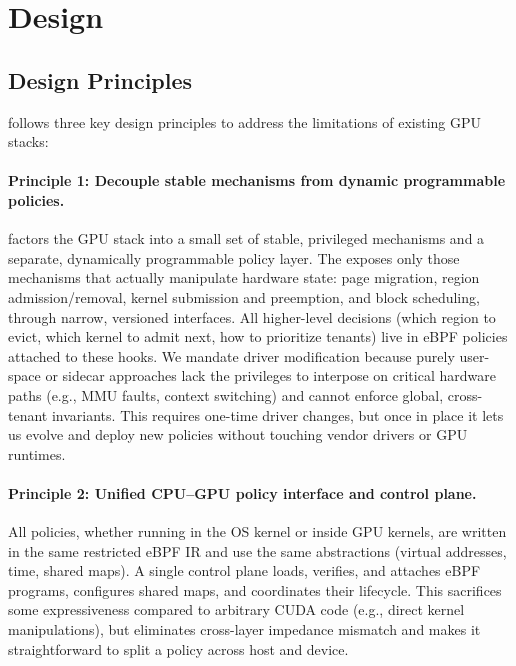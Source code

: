 \section{\sys Design}

\subsection{Design Principles}

\sys follows three key design principles to address the limitations of existing GPU stacks:

\paragraph{Principle 1: Decouple stable mechanisms from dynamic programmable policies.}
\sys factors the GPU stack into a small set of stable, privileged mechanisms and a separate, dynamically programmable policy layer. The \sysdriver exposes only those mechanisms that actually manipulate hardware state: page migration, region admission/removal, kernel submission and preemption, and block scheduling, through narrow, versioned interfaces. All higher-level decisions (which region to evict, which kernel to admit next, how to prioritize tenants) live in eBPF policies attached to these hooks. We mandate driver modification because purely user-space or sidecar approaches lack the privileges to interpose on critical hardware paths (e.g., MMU faults, context switching) and cannot enforce global, cross-tenant invariants. This requires one-time driver changes, but once in place it lets us evolve and deploy new policies without touching vendor drivers or GPU runtimes.

\paragraph{Principle 2: Unified CPU--GPU policy interface and control plane.}
All \sys policies, whether running in the OS kernel or inside GPU kernels, are written in the same restricted eBPF IR and use the same abstractions (virtual addresses, time, shared maps). A single control plane loads, verifies, and attaches eBPF programs, configures shared maps, and coordinates their lifecycle. This sacrifices some expressiveness compared to arbitrary CUDA code (e.g., direct kernel manipulations), but eliminates cross-layer impedance mismatch and makes it straightforward to split a policy across host and device.

